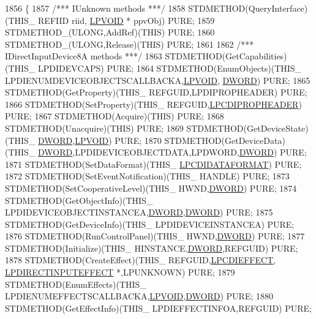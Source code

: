 \begin{DoxyCode}
1856 \{
1857     \textcolor{comment}{/*** IUnknown methods ***/}
1858     STDMETHOD(QueryInterface)(THIS\_ REFIID riid, \hyperlink{a00003_ae611cd6871649dbfe37273a0253d5e61}{LPVOID} * ppvObj) PURE;
1859     STDMETHOD\_(ULONG,AddRef)(THIS) PURE;
1860     STDMETHOD\_(ULONG,Release)(THIS) PURE;
1861 
1862     \textcolor{comment}{/*** IDirectInputDevice8A methods ***/}
1863     STDMETHOD(GetCapabilities)(THIS\_ LPDIDEVCAPS) PURE;
1864     STDMETHOD(EnumObjects)(THIS\_ LPDIENUMDEVICEOBJECTSCALLBACKA,\hyperlink{a00003_ae611cd6871649dbfe37273a0253d5e61}{LPVOID},
      \hyperlink{a00003_a50e15ae51c87ae06ab29c8148cb5f36c}{DWORD}) PURE;
1865     STDMETHOD(GetProperty)(THIS\_ REFGUID,LPDIPROPHEADER) PURE;
1866     STDMETHOD(SetProperty)(THIS\_ REFGUID,\hyperlink{a00003_aa73246465a32c316894f99e088564911}{LPCDIPROPHEADER}) PURE;
1867     STDMETHOD(Acquire)(THIS) PURE;
1868     STDMETHOD(Unacquire)(THIS) PURE;
1869     STDMETHOD(GetDeviceState)(THIS\_ \hyperlink{a00003_a50e15ae51c87ae06ab29c8148cb5f36c}{DWORD},\hyperlink{a00003_ae611cd6871649dbfe37273a0253d5e61}{LPVOID}) PURE;
1870     STDMETHOD(GetDeviceData)(THIS\_ \hyperlink{a00003_a50e15ae51c87ae06ab29c8148cb5f36c}{DWORD},LPDIDEVICEOBJECTDATA,LPDWORD,\hyperlink{a00003_a50e15ae51c87ae06ab29c8148cb5f36c}{DWORD}) PURE;
1871     STDMETHOD(SetDataFormat)(THIS\_ \hyperlink{a00003_ab7e0c3254f09795a4a2176cac228ba7d}{LPCDIDATAFORMAT}) PURE;
1872     STDMETHOD(SetEventNotification)(THIS\_ HANDLE) PURE;
1873     STDMETHOD(SetCooperativeLevel)(THIS\_ HWND,\hyperlink{a00003_a50e15ae51c87ae06ab29c8148cb5f36c}{DWORD}) PURE;
1874     STDMETHOD(GetObjectInfo)(THIS\_ LPDIDEVICEOBJECTINSTANCEA,\hyperlink{a00003_a50e15ae51c87ae06ab29c8148cb5f36c}{DWORD},\hyperlink{a00003_a50e15ae51c87ae06ab29c8148cb5f36c}{DWORD}) PURE;
1875     STDMETHOD(GetDeviceInfo)(THIS\_ LPDIDEVICEINSTANCEA) PURE;
1876     STDMETHOD(RunControlPanel)(THIS\_ HWND,\hyperlink{a00003_a50e15ae51c87ae06ab29c8148cb5f36c}{DWORD}) PURE;
1877     STDMETHOD(Initialize)(THIS\_ HINSTANCE,\hyperlink{a00003_a50e15ae51c87ae06ab29c8148cb5f36c}{DWORD},REFGUID) PURE;
1878     STDMETHOD(CreateEffect)(THIS\_ REFGUID,\hyperlink{a00003_a7913240b16286bfdcb811a35a982b236}{LPCDIEFFECT},
      \hyperlink{a00003_ac8278f319038d7db709c5ea828830fb9}{LPDIRECTINPUTEFFECT} *,LPUNKNOWN) PURE;
1879     STDMETHOD(EnumEffects)(THIS\_ LPDIENUMEFFECTSCALLBACKA,\hyperlink{a00003_ae611cd6871649dbfe37273a0253d5e61}{LPVOID},\hyperlink{a00003_a50e15ae51c87ae06ab29c8148cb5f36c}{DWORD}) PURE;
1880     STDMETHOD(GetEffectInfo)(THIS\_ LPDIEFFECTINFOA,REFGUID) PURE;

\end{DoxyCode}
